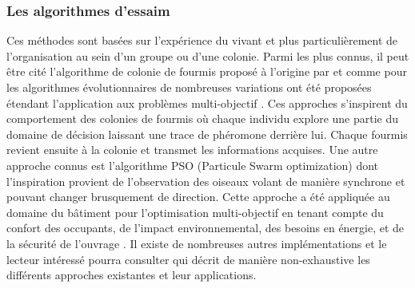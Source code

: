 \subsubsection{Les algorithmes d’essaim} %
\label{ssub:les_algorithmes_d_essaim}
Ces méthodes sont basées sur l’expérience du vivant et plus particulièrement de
l’organisation au sein d’un groupe ou d’une colonie. Parmi les plus connus, il peut être
cité l’algorithme de colonie de fourmis proposé à l’origine par \cite{Colorni1992509}
et comme pour les algorithmes évolutionnaires de nombreuses variations ont été proposées
étendant l’application aux problèmes multi-objectif \parencite{MichaelGuntsch2003,Shea2006627}.
Ces approches s’inspirent du comportement des colonies de fourmis où chaque individu
explore une partie du domaine de décision laissant une trace de phéromone derrière lui.
Chaque fourmis revient ensuite à la colonie et transmet les informations acquises.
Une autre approche connus est l’algorithme PSO (Particule Swarm optimization) dont
l’inspiration provient de l’observation des oiseaux volant de manière synchrone et
pouvant changer brusquement de direction. Cette approche a été appliquée au domaine
du bâtiment pour l’optimisation multi-objectif en tenant compte du confort des occupants,
de l’impact environnemental, des besoins en énergie, et de la sécurité de l’ouvrage \parencite{Armand-Decker2015}.
Il existe de nombreuses autres implémentations et le lecteur intéressé pourra consulter
\cite{Aboul-EllaHassanien2015} qui décrit de manière non-exhaustive les différents
approches existantes et leur applications.


